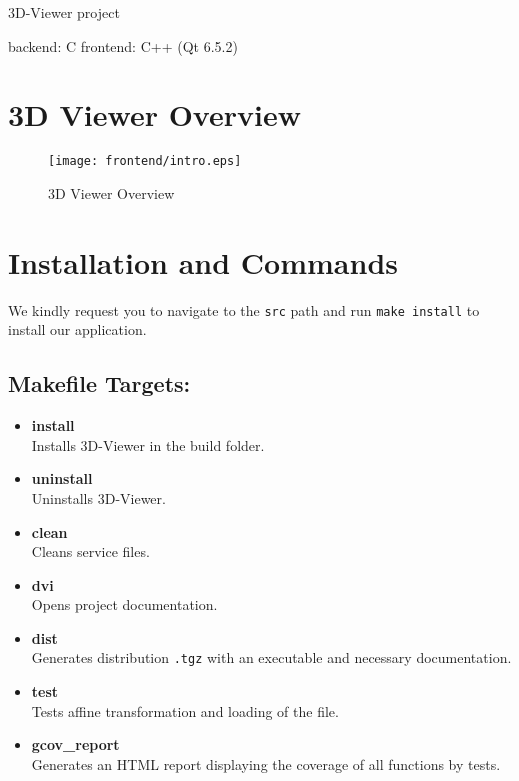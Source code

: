 \documentclass{article}
\begin{document}
{\Large 3D-Viewer project}
	
backend: C
frontend: C++ (Qt 6.5.2)

\section{3D Viewer Overview}
\label{3d-viewer-overview}

\begin{figure}[h]
      \centering
      \texttt{[image: frontend/intro.eps]}
      \caption{3D Viewer Overview}
      \label{fig:your_image}
\end{figure}
    
        
\section{Installation and Commands}
\label{installation-and-commands}

We kindly request you to navigate to the \texttt{src} path and run \texttt{make install} to install our application.

\subsection{Makefile Targets:}
\begin{itemize}
  \item \textbf{install} \\
        Installs 3D-Viewer in the build folder.
  \item \textbf{uninstall} \\
        Uninstalls 3D-Viewer.
  \item \textbf{clean} \\
        Cleans service files.
  \item \textbf{dvi} \\
        Opens project documentation.
  \item \textbf{dist} \\
        Generates distribution \texttt{.tgz} with an executable and necessary documentation.
  \item \textbf{test} \\
        Tests affine transformation and loading of the file.
  \item \textbf{gcov\_report} \\
        Generates an HTML report displaying the coverage of all functions by tests.
\end{itemize}
\end{document}
